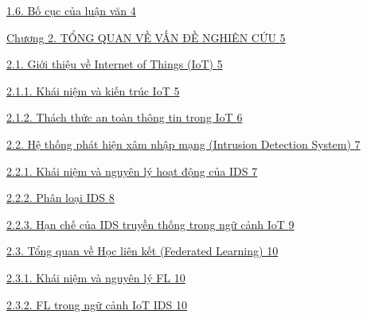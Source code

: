 \hyperref[bux1ed1-cux1ee5c-cux1ee7a-luux1eadn-vux103n]{1.6. Bố cục của luận văn \hyperref[bux1ed1-cux1ee5c-cux1ee7a-luux1eadn-vux103n]{4}}

\hyperref[chux1b0ux1a1ng-2.-tux1ed5ng-quan-vux1ec1-vux1ea5n-ux111ux1ec1-nghiuxean-cux1ee9u]{Chương 2. TỔNG QUAN VỀ VẤN ĐỀ NGHIÊN CỨU \hyperref[chux1b0ux1a1ng-2.-tux1ed5ng-quan-vux1ec1-vux1ea5n-ux111ux1ec1-nghiuxean-cux1ee9u]{5}}

\hyperref[giux1edbi-thiux1ec7u-vux1ec1-internet-of-things-iot]{2.1. Giới thiệu về Internet of Things (IoT) \hyperref[giux1edbi-thiux1ec7u-vux1ec1-internet-of-things-iot]{5}}

\hyperref[khuxe1i-niux1ec7m-vuxe0-kiux1ebfn-truxfac-iot]{2.1.1. Khái niệm và kiến trúc IoT \hyperref[khuxe1i-niux1ec7m-vuxe0-kiux1ebfn-truxfac-iot]{5}}

\hyperref[thuxe1ch-thux1ee9c-an-touxe0n-thuxf4ng-tin-trong-iot]{2.1.2. Thách thức an toàn thông tin trong IoT \hyperref[thuxe1ch-thux1ee9c-an-touxe0n-thuxf4ng-tin-trong-iot]{6}}

\hyperref[hux1ec7-thux1ed1ng-phuxe1t-hiux1ec7n-xuxe2m-nhux1eadp-mux1ea1ng-intrusion-detection-system]{2.2. Hệ thống phát hiện xâm nhập mạng (Intrusion Detection System) \hyperref[hux1ec7-thux1ed1ng-phuxe1t-hiux1ec7n-xuxe2m-nhux1eadp-mux1ea1ng-intrusion-detection-system]{7}}

\hyperref[khuxe1i-niux1ec7m-vuxe0-nguyuxean-luxfd-houx1ea1t-ux111ux1ed9ng-cux1ee7a-ids]{2.2.1. Khái niệm và nguyên lý hoạt động của IDS \hyperref[khuxe1i-niux1ec7m-vuxe0-nguyuxean-luxfd-houx1ea1t-ux111ux1ed9ng-cux1ee7a-ids]{7}}

\hyperref[phuxe2n-loux1ea1i-ids]{2.2.2. Phân loại IDS \hyperref[phuxe2n-loux1ea1i-ids]{8}}

\hyperref[hux1ea1n-chux1ebf-cux1ee7a-ids-truyux1ec1n-thux1ed1ng-trong-ngux1eef-cux1ea3nh-iot]{2.2.3. Hạn chế của IDS truyền thống trong ngữ cảnh IoT \hyperref[hux1ea1n-chux1ebf-cux1ee7a-ids-truyux1ec1n-thux1ed1ng-trong-ngux1eef-cux1ea3nh-iot]{9}}

\hyperref[tux1ed5ng-quan-vux1ec1-hux1ecdc-liuxean-kux1ebft-federated-learning]{2.3. Tổng quan về Học liên kết (Federated Learning) \hyperref[tux1ed5ng-quan-vux1ec1-hux1ecdc-liuxean-kux1ebft-federated-learning]{10}}

\hyperref[khuxe1i-niux1ec7m-vuxe0-nguyuxean-luxfd-fl]{2.3.1. Khái niệm và nguyên lý FL \hyperref[khuxe1i-niux1ec7m-vuxe0-nguyuxean-luxfd-fl]{10}}

\hyperref[fl-trong-ngux1eef-cux1ea3nh-iot-ids]{2.3.2. FL trong ngữ cảnh IoT IDS \hyperref[fl-trong-ngux1eef-cux1ea3nh-iot-ids]{10}}

